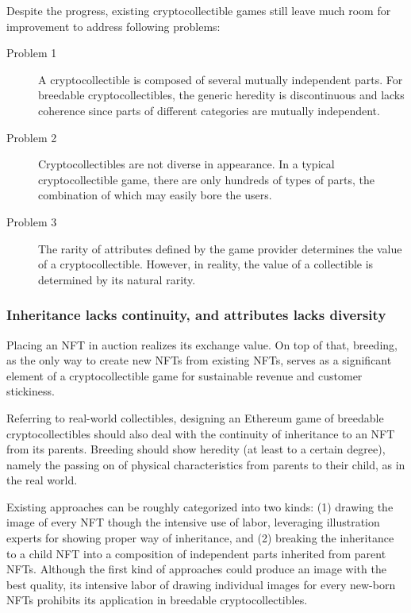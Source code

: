 \documentclass[b5paper]{article}
\begin{document}
Despite the progress, existing cryptocollectible games still leave much room for improvement to address following problems:

\begin{description}
\item [Problem 1\label{problem:1}] A cryptocollectible is composed of several mutually independent parts. For breedable cryptocollectibles, the generic heredity is discontinuous and lacks coherence since parts of different categories are mutually independent.
\item [Problem 2\label{problem:2}] Cryptocollectibles are not diverse in appearance. In a typical cryptocollectible game, there are only hundreds of types of parts, the combination of which may easily bore the users.
\item [Problem 3\label{problem:3}] The rarity of attributes defined by the game provider determines the value of a cryptocollectible. However, in reality, the value of a collectible is determined by its natural rarity.
\end{description}

\subsubsection{Inheritance lacks continuity, and attributes lacks diversity}

Placing an NFT in auction realizes its exchange value. 
On top of that, breeding, as the only way to create new NFTs from existing NFTs, 
serves as a significant element of a cryptocollectible game for sustainable revenue and customer stickiness.

Referring to real-world collectibles, designing an Ethereum game of breedable cryptocollectibles should also deal with the continuity of inheritance to an NFT from its parents. 
Breeding should show heredity (at least to a certain degree), namely the passing on of physical characteristics from parents to their child, as in the real world.

Existing approaches can be roughly categorized into two kinds: 
(1) drawing the image of every NFT though the intensive use of labor, leveraging illustration experts for showing proper way of inheritance, and 
(2) breaking the inheritance to a child NFT into a composition of independent parts inherited from parent NFTs. 
Although the first kind of approaches could produce an image with the best quality, its intensive labor of drawing individual images for every new-born NFTs prohibits its application in breedable cryptocollectibles.
\end{document}
